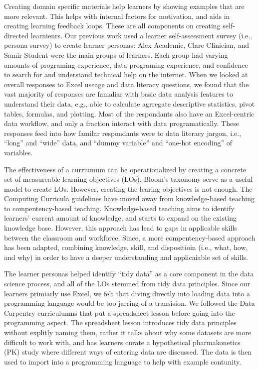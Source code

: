 \documentclass[030-workshop.tex]{subfiles}
\begin{document}
    Creating domain specific materials help learners by showing examples that are more relevant.
    This helps with internal factors for motivation, and aids in creating learning feedback loops.
    These are all components on creating self-directed learnienrs.
    Our previous work used a learner self-assessment survey (i.e., persona survey) to create learner personas:
    Alex Academic, Clare Clinician, and Samir Student were the main groups of learners.
    Each group had varying amounts of
    programing experience, data programing experience, and
    confidence to search for and understand technical help on the internet.
    When we looked at overall responses to Excel useage and data literacy questions,
    we found that the vast majority of responses are famaliar with basic data analysis features to understand their data,
    e.g., able to calculate agrregate descriptive statistics,
    pivot tables,
    formulas,
    and plotting. %
    Most of the respondants also have an Excel-centric data workflow,
    and only a fraction interact with data programatically. %
    These responses feed into how familar respondants were to data literacy jargon, i.e., ``long'' and ``wide'' data,
    and ``dummy variable'' and ``one-hot encoding'' of variables.

    The effectiveness of a curriumum can be operationalized by creating a concrete set of
    measureable learning objectives (LOs).
    Bloom's taxonomy serve as a useful model to create LOs.
    However, creating the learing objectives is not enough.
    The Computing Curricula guidelines have moved away from knowledge-based teaching to compentency-based teaching.
    Knowledge-based teaching aims to identify learners' current amount of knowledge,
    and starts to expand on the existing knowledge base.
    However, this approach has lead to gaps in applicable skills between the classroom and workforce.
    Since, a more compentency-based approach has been adapted,
    combining knowledge, skill, and dispositioin (i.e., what, how, and why) in order
    to have a deeper understanding and applicaiable set of skills.

    The learner personas helped identify ``tidy data'' as a core component in the data science process,
    and all of the LOs stemmed from tidy data principles.
    Since our learners primiarly use Excel,
    we felt that diving directly into loading data into a programming language would be too jarring of a transision.
    We followed the Data Carpentry curriculumns that put a spreadsheet lesson before going into the programming aspect.
    The spreadsheet lesson introduces tidy data principles without explitly naming them,
    rather it talks about why some datasets are more difficult to work with,
    and has learners curate a hypothetical pharmakonetics (PK) study where different ways of entering data are discussed.
    The data is then used to import into a programming language to help with example contunity.
\end{document}
